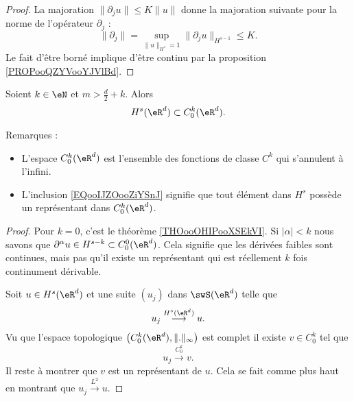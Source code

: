 \begin{proof}
    La majoration \( \| \partial_ju \|\leq K\| u \|\) donne la majoration suivante pour la norme de l'opérateur \( \partial_j\) :
    \begin{equation}
        \| \partial_j \|=\sup_{\| u \|_{H^s}=1}\| \partial_ju \|_{H^{s-1}}\leq K.
    \end{equation}
    Le fait d'être borné implique d'être continu par la proposition \ref{PROPooQZYVooYJVlBd}.
\end{proof}

\begin{theorem}
    Soient \( k\in \eN\) et \( m>\frac{ d }{ 2 }+k\). Alors
    \begin{equation}        \label{EQooIJZOooZiYSnJ}
        H^s(\eR^d)\subset C_0^k(\eR^d).
    \end{equation}
\end{theorem}

Remarques :
\begin{itemize}
    \item
        L'espace \( C_0^k(\eR^d)\) est l'ensemble des fonctions de classe \( C^k\) qui s'annulent à l'infini.
    \item 
        L'inclusion \eqref{EQooIJZOooZiYSnJ} signifie que tout élément dans \( H^s\) possède un représentant dans \( C_0^k(\eR^d)\).
\end{itemize}

\begin{proof}
    Pour \( k=0\), c'est le théorème \ref{THOooOHIPooXSEkVI}. Si \( | \alpha |<k\) nous savons que \( \partial^{\alpha}u\in H^{s-k}\subset C_0^0(\eR^d) \). Cela signifie que les dérivées faibles sont continues, mais pas qu'il existe un représentant qui est réellement \( k\) fois continument dérivable.

    Soit \( u\in H^s(\eR^d)\) et une suite \( (u_j)  \) dans \( \swS(\eR^d)\) telle que
    \begin{equation}
        u_j\stackrel{H^s(\eR^d)}{\longrightarrow}u.
    \end{equation}
    Vu que l'espace topologique \( \big( C_0^k(\eR^d),\| . \|_{\infty} \big)\) est complet il existe \( v\in C_0^k\) tel que
    \begin{equation}
        u_j\stackrel{C_0^k}{\longrightarrow}v.
    \end{equation}
    Il reste à montrer que \( v\) est un représentant de \( u\). Cela se fait comme plus haut en montrant que \( u_j\stackrel{L^2}{\longrightarrow}u\).
\end{proof}
